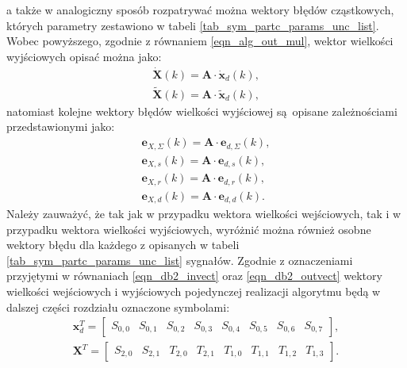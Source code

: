 a także w analogiczny sposób rozpatrywać można wektory błędów cząstkowych, których parametry zestawiono w tabeli \ref{tab_sym_partc_params_unc_list}. Wobec powyższego, zgodnie z równaniem \eqref{eqn_alg_out_mul}, wektor wielkości wyjściowych opisać można jako:
\begin{gather}
\dot{\mathbf{X}}(k) = \mathbf{A} \cdot \mathbf{\dot{x}}_{d}(k) \label{eqn_sym_partd_output_ideal}, \\
\tilde{\mathbf{X}}(k) = \mathbf{A} \cdot \mathbf{\tilde{x}}_{d}(k) \label{eqn_sym_partd_output_real},
\end{gather}
natomiast kolejne wektory błędów wielkości wyjściowej są opisane zależnościami przedstawionymi jako:
\begin{gather}
\mathbf{e}_{X,\Sigma}(k) = \mathbf{A} \cdot \mathbf{e}_{d,\Sigma}(k) \label{eqn_sym_partd_output_error_sum}, \\
\mathbf{e}_{X,s}(k) = \mathbf{A} \cdot \mathbf{e}_{d,s}(k) \label{eqn_sym_partd_output_error_stat}, \\
\mathbf{e}_{X,r}(k) = \mathbf{A} \cdot \mathbf{e}_{d,r}(k) \label{eqn_sym_partd_output_error_rand}, \\
\mathbf{e}_{X,d}(k) = \mathbf{A} \cdot \mathbf{e}_{d,d}(k) \label{eqn_sym_partd_output_error_dyn}.
\end{gather}
Należy zauważyć, że tak jak w przypadku wektora wielkości wejściowych, tak i w przypadku wektora wielkości wyjściowych, wyróżnić można również osobne wektory błędu dla każdego z opisanych w tabeli \ref{tab_sym_partc_params_unc_list} sygnałów. Zgodnie z oznaczeniami przyjętymi w równaniach \eqref{eqn_db2_invect} oraz \eqref{eqn_db2_outvect} wektory wielkości wejściowych i wyjściowych pojedynczej realizacji algorytmu będą w dalszej części rozdziału oznaczone symbolami:
\begin{gather}
\mathbf{x}_{d}^{T} =
\begin{bmatrix}
S_{0,0} & S_{0,1} & S_{0,2} & S_{0,3} & S_{0,4} & S_{0,5} & S_{0,6} & S_{0,7}
\end{bmatrix}
\label{eqn_sym_partd_invect}, \\
\mathbf{X}^{T} =
\begin{bmatrix}
S_{2,0} & S_{2,1} & T_{2,0} & T_{2,1} & T_{1,0} & T_{1,1} & T_{1,2} & T_{1,3}
\end{bmatrix}
\label{eqn_sym_partd_outvect}.
\end{gather}

